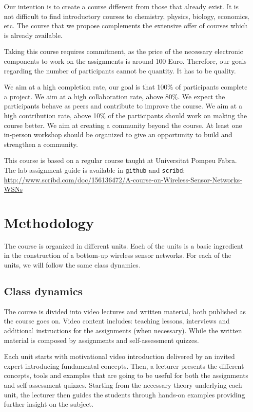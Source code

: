 \documentclass[a4paper,oneside]{book}   %
\begin{document}
Our intention is to create a course different from those that already exist.
It is not difficult to find introductory courses to chemistry, physics, biology, economics, etc.
The course that we propose complements the extensive offer of courses which is already available.

Taking this course requires commitment, as the price of the necessary electronic components to work on the assignments is around 100 Euro.
Therefore, our goals regarding the number of participants cannot be quantity.
It has to be quality.

We aim at a high completion rate,  our goal is that 100\%  of participants complete a project.
We aim at a high collaboration rate, above 80\%.
We expect the participants behave as peers and contribute to improve the course.
We aim at a high contribution rate, above 10\% of the participants should work on making the course better.
We aim at creating a community beyond the course.
At least one in-person workshop should be organized to give an opportunity to build and strengthen a community.

This course is based on a regular course taught at Universitat Pompeu Fabra.
The lab assignment guide is available in \texttt{github} and \texttt{scribd}: \url{http://www.scribd.com/doc/156136472/A-course-on-Wireless-Sensor-Networks-WSNs}


\section{Methodology}

The course is organized in different units.
Each of the units is a basic ingredient in the construction of a bottom-up wireless sensor networks.
For each of the units, we will follow the same class dynamics.

\subsection{Class dynamics}

The course is divided into video lectures and written material, both published as the course goes on. Video content includes: teaching lessons, interviews and additional instructions for the assignments (when necessary). While the written material is composed by assignments and self-assessment quizzes. 

Each unit starts with motivational video introduction delivered by an invited expert introducing fundamental concepts.
Then, a lecturer presents the different concepts, tools and examples that are going to be useful for both the assignments and self-assessment quizzes.
Starting from the necessary theory underlying each unit, the lecturer then guides the students through hands-on examples providing further insight on the subject.
\end{document}
